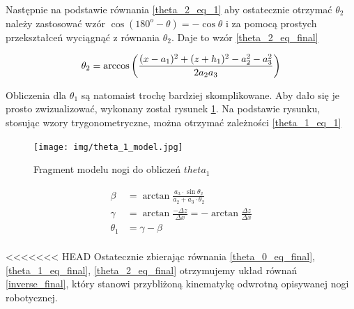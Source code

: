 Następnie na podstawie równania \ref{theta_2_eq_1} aby ostatecznie otrzymać $\theta_2$ należy zastosować wzór $\cos{(180^o - \theta)} = -\cos{\theta}$ i za pomocą prostych przekształceń wyciągnąć z równania $\theta_2$. Daje to wzór \ref{theta_2_eq_final} \cite{SCARA_model_calc}

\begin{equation} \label{theta_2_eq_final}
\theta_2 = \arccos{\left( \frac{(x - a_1)^2 + (z + h_1)^2 - a_2^2 - a_3^2}{2 a_2 a_3} \right)}\\ 
\end{equation} 

Obliczenia dla $\theta_1$ są natomaist trochę bardziej skomplikowane. Aby dało się je prosto zwizualizować, wykonany został rysunek \ref{theta_1_model}. Na podstawie rysunku, stosując wzory trygonometryczne, można otrzymać zależności \ref{theta_1_eq_1} \cite{SCARA_model_calc}

\begin{figure}[h!]
\texttt{[image: img/theta\_1\_model.jpg]}
\caption{Fragment modelu nogi do obliczeń $theta_1$}
\label{theta_1_model}
\end{figure}

\begin{equation}\label{theta_1_eq_1}
\begin{split}
\beta &= \arctan{\frac{a_3 \cdot \sin{\theta_2}}{a_2 + a_3 \cdot{\theta_2}}}\\
\gamma &= \arctan{\frac{-\Delta z}{\Delta x}} = - \arctan{\frac{\Delta z}{\Delta x}}\\
\theta_1 &= \gamma - \beta\\
\end{split}
\end{equation}

<<<<<<< HEAD
Ostatecznie zbierając równania \ref{theta_0_eq_final}, \ref{theta_1_eq_final}, \ref{theta_2_eq_final} otrzymujemy układ równań \ref{inverse_final}, który stanowi przybliżoną kinematykę odwrotną opisywanej nogi robotycznej.

